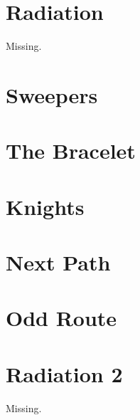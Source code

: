 \documentclass[a4paper, 10pt]{article}
\let\stdsection\section
\renewcommand\section{\newpage\stdsection}
\newcommand{\includecode}[1]{
    }
\begin{document}
    \section{Radiation}
        Missing.
        
    \section{Sweepers}
        \includecode{../problems/w12/Sweepers/Sweepers1.cpp}
        
    \section{The Bracelet}
        \includecode{../problems/w12/The_Bracelet/TheBracelet1.cpp}
        
    
    \section{Knights}
        \includecode{../problems/w13/Knights/Knights1.cpp}
        
    \section{Next Path}
        \includecode{../problems/w13/NextPath/NextPath1.cpp}
        
    \section{Odd Route}
        \includecode{../problems/w13/OddRoute/OddRoute1.cpp}
        
    \section{Radiation 2}
        Missing.
    
\end{document}
